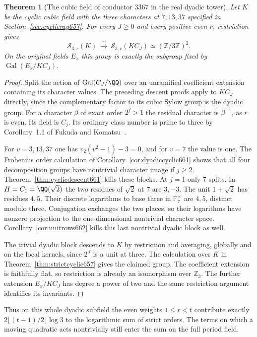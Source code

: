 \documentclass[a4paper,11pt]{article}
\newtheorem{theorem}[proposition]{Theorem}
\theoremstyle{definition}
\theoremstyle{remark}
\newcommand{\ZZ}{\mathbb Z}\newcommand{\ord}{\operatorname{ord}}
\numberwithin{equation}{section}
\begin{document}
\begin{theorem}[The cubic field of conductor \(3367\) in the real dyadic tower]
\leavevmode\label{thm:cubictower662}
Let \(K\) be the cyclic cubic field with the three characters
at \(7,13,37\) specified in Section~\ref{sec:cyclicray657}.
For every \(J\ge0\) and every positive even \(r\), restriction gives
\[
 \mathcal S_{3,r}(K)\ \xrightarrow{\ \sim\ }\ 
       \mathcal S_{3,r}(K C_J)\simeq(\ZZ/3\ZZ)^2 .
\]
On the original fields \(E_x\) this group is exactly the subgroup
fixed by \(\operatorname{Gal}(E_x/K C_J)\).
\end{theorem}
\begin{proof}
Split the action of \(\operatorname{Gal}(C_J/\QQ)\) over an
unramified coefficient extension containing its character values.
The preceding descent proofs apply to \(K C_J\) directly, since
the complementary factor to its cubic Sylow group is the dyadic
group. For a character \(\beta\) of exact order \(2^j>1\) the
residual character is \(\bar\beta^{-1}\), as \(r\) is even.
Its field is \(C_j\). Its ordinary class number is prime to
three by Corollary~1.1 of Fukuda and Komatsu~\cite{V-III-weberFK524}.

For \(v=3,13,37\) one has \(v_2(v^2-1)-3=0\), and for \(v=7\)
the value is one. The Frobenius order calculation of
Corollary~\ref{cor:dyadiccyclic661} shows that all four
decomposition groups have nontrivial character image if \(j\ge2\).
Theorem~\ref{thm:cyclicdescent661} kills these blocks. At \(j=1\)
only \(7\) splits. In \(H=C_1=\QQ(\sqrt2)\) the two residues
of \(\sqrt2\) at \(7\) are \(3,-3\). The unit \(1+\sqrt2\)
has residues \(4,5\). Their discrete logarithms to base three
in \(\mathbb F_7^\times\) are \(4,5\), distinct modulo three.
Conjugation exchanges the two places, so their logarithms have
nonzero projection to the one-dimensional nontrivial character
space. Corollary~\ref{cor:unitrows662} kills this last
nontrivial dyadic block as well.

The trivial dyadic block descends to \(K\) by restriction and
averaging, globally and on the local kernels, since \(2^J\) is
a unit at three. The calculation over \(K\) in
Theorem~\ref{thm:strictcyclic657} gives the claimed group.
The coefficient extension is faithfully flat, so restriction is
already an isomorphism over \(\ZZ_3\). The further extension
\(E_x/K C_J\) has degree a power of two and the same restriction
argument identifies its invariants.
\end{proof}

Thus on this whole dyadic subfield the even weights
\(1\le r<t\) contribute exactly
\(2\lfloor(t-1)/2\rfloor\log 3\) to the logarithmic sum of
strict orders. The terms on which a moving quadratic acts
nontrivially still enter the sum on the full period field.
\end{document}
